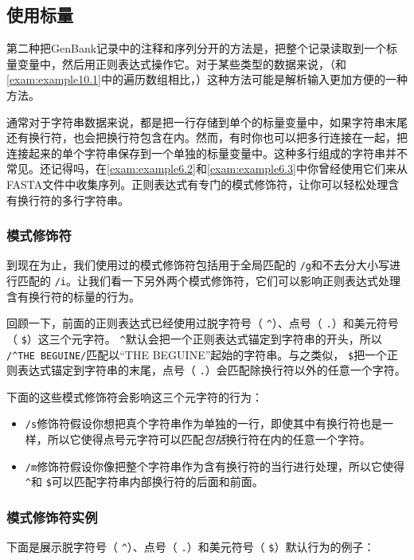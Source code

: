 \subsection{使用标量}
第二种把GenBank记录中的注释和序列分开的方法是，把整个记录读取到一个标量变量中，然后用正则表达式操作它。对于某些类型的数据来说，（和\autoref{exam:example10.1}中的遍历数组相比，）这种方法可能是解析输入更加方便的一种方法。

通常对于字符串数据来说，都是把一行存储到单个的标量变量中，如果字符串末尾还有换行符，也会把换行符包含在内。然而，有时你也可以把多行连接在一起，把连接起来的单个字符串保存到一个单独的标量变量中。这种多行组成的字符串并不常见。还记得吗，在\autoref{exam:example6.2}和\autoref{exam:example6.3}中你曾经使用它们来从FASTA文件中收集序列。正则表达式有专门的模式修饰符，让你可以轻松处理含有换行符的多行字符串。

\subsubsection{模式修饰符}
到现在为止，我们使用过的模式修饰符包括用于全局匹配的 \verb|/g|和不去分大小写进行匹配的 \verb|/i|。让我们看一下另外两个模式修饰符，它们可以影响正则表达式处理含有换行符的标量的行为。

回顾一下，前面的正则表达式已经使用过脱字符号（ \verb|^|）、点号（ \verb|.|）和美元符号（ \verb|$|）这三个元字符。 \verb|^|默认会把一个正则表达式锚定到字符串的开头，所以 \verb|/^THE BEGUINE/|匹配以“THE BEGUINE”起始的字符串。与之类似， \verb|$|把一个正则表达式锚定到字符串的末尾，点号（ \verb|.|）会匹配除换行符以外的任意一个字符。

下面的这些模式修饰符会影响这三个元字符的行为：

\begin{itemize}
  \item  \verb|/s|修饰符假设你想把真个字符串作为单独的一行，即使其中有换行符也是一样，所以它使得点号元字符可以匹配\textit{包括}换行符在内的任意一个字符。
  \item
     \verb|/m|修饰符假设你像把整个字符串作为含有换行符的当行进行处理，所以它使得 \verb|^|和 \verb|$|可以匹配字符串内部换行符的后面和前面。
\end{itemize}

\subsubsection{模式修饰符实例}
下面是展示脱字符号（ \verb|^|）、点号（ \verb|.|）和美元符号（ \verb|$|）默认行为的例子：

